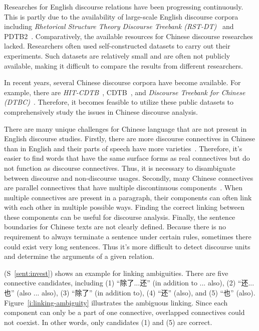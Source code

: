 Researches for English discourse relations have been progressing continuously. This is
partly due to the availability of large-scale English discourse corpora including
\textit{Rhetorical Structure Theory Discourse Treebank (RST-DT)}~\citep{Carlson01building}
and PDTB2~\citep{Prasad08thepenn}. Comparatively, the available resources for Chinese discourse
researches lacked. Researchers often used self-constructed datasets to carry
out their experiments. Such datasets are relatively small and are often not publicly
available, making it difficult to compare the results from different researchers.

In recent years, several Chinese discourse corpora have become available. For example,
there are \textit{HIT-CDTB}~\citep{zhang2014chinese}, CDTB~\citep{li2014building}, and
\textit{Discourse Treebank for Chinese (DTBC)}~\citep{zhou2014the}. Therefore, it
becomes feasible to utilize these public datasets to comprehensively study
the issues in Chinese discourse analysis.

There are many unique challenges for Chinese language that are not present in
English discourse studies. Firstly, there are more discourse connectives
in Chinese than in English and their parts of speech have more
varieties~\citep{huang2014interpretation}. Therefore, it's easier to find words
that have the same surface forms as real connectives but do not function as
discourse connectives.
Thus, it is necessary to disambiguate between
discourse and non-discourse usages.
Secondly, many Chinese connectives are parallel connectives that
have multiple discontinuous components~\citep{zhou2012pdtb}.
When multiple connectives are present in a paragraph, their components
can often link with each other in multiple possible ways.
Finding the correct linking between these components
can be useful for discourse analysis. Finally, the sentence boundaries for
Chinese texts are not clearly defined. Because there is no
requirement to always terminate a sentence under certain rules,
sometimes there could exist very long sentences. Thus it's more difficult
to detect discourse units and determine the arguments of a given relation.

(S~\ref{sent:invest}) shows an example for linking ambiguities.
There are five connective candidates, including (1) ``除了...还''
(in addition to ... also), (2) ``还...也'' (also ... also),
(3) ``除了'' (in addition to), (4) ``还'' (also), and (5) ``也'' (also).
Figure~\ref{i:linking-ambiguity} illustrates the ambiguous linking. Since each
component can only be a part of one connective, overlapped connectives could
not coexist.  In other words, only candidates (1) and (5) are correct.

